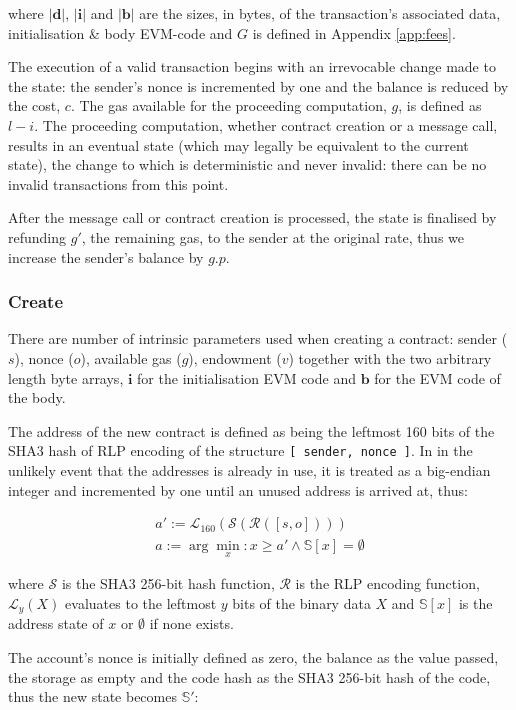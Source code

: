 \documentclass[9pt,oneside]{amsart}
\begin{document}
\begin{multicols}{2}
where $|\mathbf{d}|$, $|\mathbf{i}|$ and $|\mathbf{b}|$ are the sizes, in bytes, of the transaction's associated data, initialisation \& body EVM-code and $G$ is defined in Appendix \ref{app:fees}.

The execution of a valid transaction begins with an irrevocable change made to the state: the sender's nonce is incremented by one and the balance is reduced by the cost, $c$. The gas available for the proceeding computation, $g$, is defined as $l - i$. The proceeding computation, whether contract creation or a message call, results in an eventual state (which may legally be equivalent to the current state), the change to which is deterministic and never invalid: there can be no invalid transactions from this point.

After the message call or contract creation is processed, the state is finalised by refunding $g'$, the remaining gas, to the sender at the original rate, thus we increase the sender's balance by $g.p$.

\subsubsection{Create} \label{ch:create}

There are number of intrinsic parameters used when creating a contract: sender ($s$), nonce ($o$), available gas ($g$), endowment ($v$) together with the two arbitrary length byte arrays, $\mathbf{i}$ for the initialisation EVM code and $\mathbf{b}$ for the EVM code of the body.

The address of the new contract is defined as being the leftmost 160 bits of the SHA3 hash of RLP encoding of the structure \texttt{[ sender, nonce ]}. In in the unlikely event that the addresses is already in use, it is treated as a big-endian integer and incremented by one until an unused address is arrived at, thus:

\begin{eqnarray}
a' := \mathcal{L}_{160}(\mathcal{S}(\mathcal{R}([s, o])))\\
a := \arg \min_x : x \geq a' \wedge \mathbb{S}[x] = \emptyset
\end{eqnarray}

where $\mathcal{S}$ is the SHA3 256-bit hash function, $\mathcal{R}$ is the RLP encoding function, $\mathcal{L}_y(X)$ evaluates to the leftmost $y$ bits of the binary data $X$ and $\mathbb{S}[x]$ is the address state of $x$ or $\emptyset$ if none exists.

The account's nonce is initially defined as zero, the balance as the value passed, the storage as empty and the code hash as the SHA3 256-bit hash of the code, thus the new state becomes $\mathbb{S}'$:


\end{multicols}
\end{document}
